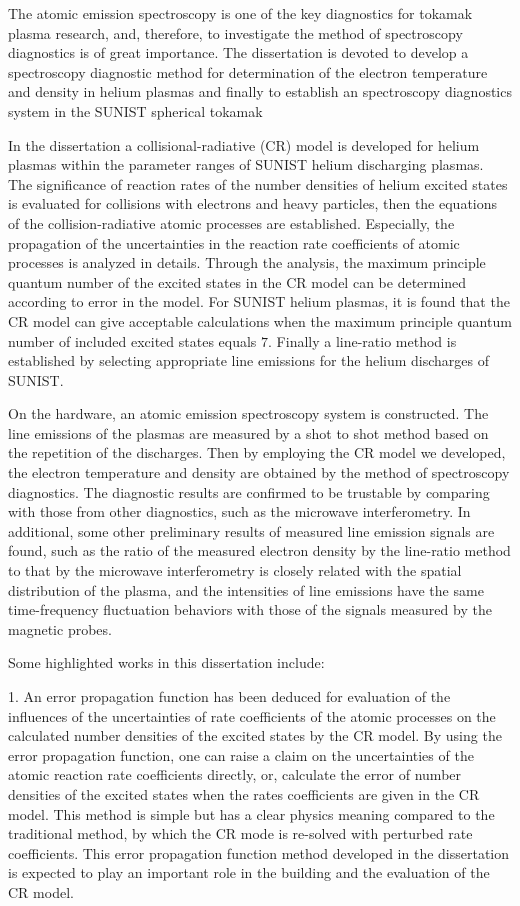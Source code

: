 \begin{eabstract}
The atomic emission spectroscopy is one of the key diagnostics for tokamak plasma research, and, therefore, to investigate the method of spectroscopy diagnostics is of great importance. The dissertation is devoted to develop a spectroscopy diagnostic method for determination of the electron temperature and density in helium plasmas and finally to establish an spectroscopy diagnostics system in the SUNIST spherical tokamak

In the dissertation a collisional-radiative (CR) model is developed for helium plasmas within the parameter ranges of SUNIST helium discharging plasmas. The significance of reaction rates of the number densities of helium excited states is evaluated for collisions with electrons and heavy particles, then the equations of the collision-radiative atomic processes are established. Especially, the propagation of the uncertainties in the reaction rate coefficients of atomic processes is analyzed in details. Through the analysis, the maximum principle quantum number of the excited states in the CR model can be determined according to error in the model. For SUNIST helium plasmas, it is found that the CR model can give acceptable calculations when the maximum principle quantum number of included excited states equals $7$. Finally a line-ratio method is established by selecting appropriate line emissions for the helium discharges of SUNIST.

On the hardware, an atomic emission spectroscopy system is constructed. The line emissions of the plasmas are measured by a shot to shot method based on the repetition of the discharges. Then by employing the CR model we developed, the electron temperature and density are obtained by the method of spectroscopy diagnostics. The diagnostic results are confirmed to be trustable by comparing with those from other diagnostics, such as the microwave interferometry. In additional, some other preliminary results of measured line emission signals are found, such as the ratio of the measured electron density by the line-ratio method to that by the microwave interferometry is closely related with the spatial distribution of the plasma, and the intensities of line emissions have the same time-frequency fluctuation behaviors with those of the signals measured by the magnetic probes.

Some highlighted works in this dissertation include:

1. An error propagation function has been deduced for evaluation of the influences of the uncertainties of rate coefficients of the atomic processes on the calculated number densities of the excited states by the CR model. By using the error propagation function, one can raise a claim on the uncertainties of the atomic reaction rate coefficients directly, or, calculate the error of number densities of the excited states when the rates coefficients are given in the CR model. This method is simple but has a clear physics meaning compared to the traditional method, by which the CR mode is re-solved with perturbed rate coefficients. This error propagation function method developed in the dissertation is expected to play an important role in the building and the evaluation of the CR model.


\end{eabstract}
